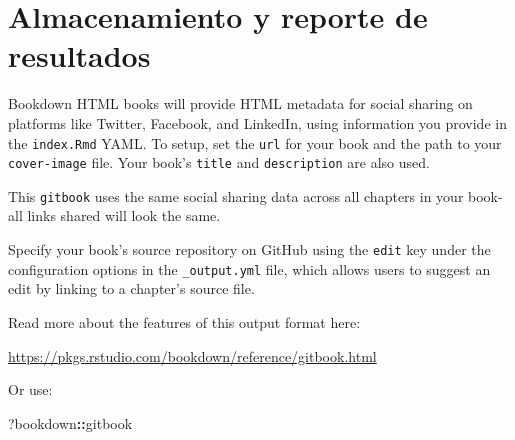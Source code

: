 \documentclass[
]{book}
\newenvironment{Shaded}{\begin{snugshade}}{\end{snugshade}}
\newcommand{\NormalTok}[1]{#1}
\newcommand{\SpecialCharTok}[1]{\textcolor[rgb]{0.81,0.36,0.00}{\textbf{#1}}}
\theoremstyle{definition}
\theoremstyle{definition}
\theoremstyle{definition}
\theoremstyle{definition}
\theoremstyle{remark}
\begin{document}
\hypertarget{almacenamiento-y-reporte-de-resultados}{%
\section{Almacenamiento y reporte de resultados}\label{almacenamiento-y-reporte-de-resultados}}

Bookdown HTML books will provide HTML metadata for social sharing on platforms like Twitter, Facebook, and LinkedIn, using information you provide in the \texttt{index.Rmd} YAML. To setup, set the \texttt{url} for your book and the path to your \texttt{cover-image} file. Your book's \texttt{title} and \texttt{description} are also used.

This \texttt{gitbook} uses the same social sharing data across all chapters in your book- all links shared will look the same.

Specify your book's source repository on GitHub using the \texttt{edit} key under the configuration options in the \texttt{\_output.yml} file, which allows users to suggest an edit by linking to a chapter's source file.

Read more about the features of this output format here:

\url{https://pkgs.rstudio.com/bookdown/reference/gitbook.html}

Or use:

\begin{Shaded}
\begin{Highlighting}[]
\NormalTok{?bookdown}\SpecialCharTok{::}\NormalTok{gitbook}
\end{Highlighting}
\end{Shaded}


  
\end{document}
